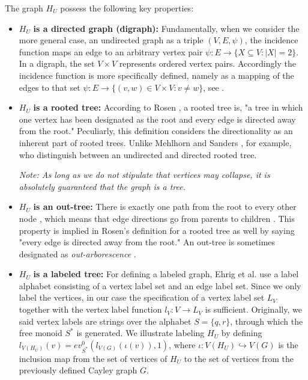 \begin{definition}
The graph $H_U$ possess the following key properties:
\begin{itemize}
	\item \mbox{\boldmath$H_U$} \textbf{is a directed graph (digraph):} Fundamentally, when we consider the more general case, an undirected graph as a triple $(V,E,\psi)$, the incidence function maps an edge to an arbitrary vertex pair $\psi : E\rightarrow\{X\subseteq V:\left|X\right|=2\}$. In a digraph, the set $V\times V$ represents ordered vertex pairs. Accordingly the incidence function is more specifically defined, namely as a mapping of the edges to that set $\psi : E\rightarrow\{(v,w)\in V\times V:v\neq w\}$, see \cite[p.~15]{Ref_Korte_Vygen}.
	\item \mbox{\boldmath$H_U$} \textbf{is a rooted tree:} According to Rosen \cite[p.~747]{Ref_Rosen}, a rooted tree is, "a tree in which one vertex has been designated as the root and every edge is directed away from the root." Peculiarly, this definition considers the directionality as an inherent part of rooted trees. Unlike Mehlhorn and Sanders \cite[p.~52]{Ref_Mehlhorn_Sanders}, for example, who distinguish between an undirected and directed rooted tree.
	\par\smallskip
	\textit{Note: As long as we do not stipulate that vertices may collapse, it is absolutely guaranteed that the graph is a tree.}
	\item \mbox{\boldmath$H_U$} \textbf{is an out-tree:} There is exactly one	path from the root to every other node \cite[p.~52]{Ref_Mehlhorn_Sanders}, which means that edge directions go from parents to children \cite[p.~108]{Ref_Du_Ko_Hu}. This property is implied in Rosen's definition for a rooted tree as well by saying "every edge is directed away from the root." An out-tree is sometimes designated as \textit{out-arborescence} \cite[p.~108]{Ref_Du_Ko_Hu}.
	\item \mbox{\boldmath$H_U$} \textbf{is a labeled tree:} For defining a labeled graph, Ehrig et al. \cite[p.~23]{Ref_Ehrig_etal} use a label alphabet consisting of a vertex label set and an edge label set. Since we only label the vertices, in our case the specification of a vertex label set $L_V$ together with the vertex label function $l_V:V\rightarrow L_V$ is sufficient. Originally, we said vertex labels are strings over the alphabet $S=\{q,r\}$, through which the free monoid $S^\ast$ is generated. We illustrate labeling $H_U$ by defining $l_{V(H_U)}(v)=ev^0_{S^\ast}(l_{V(G)}(\iota(v)),1)$, where $\iota:V(H_U)\hookrightarrow V(G)$ is the inclusion map \cite[p.~142]{Ref_Childs} from the set of vertices of $H_U$ to the set of vertices from the previously defined Cayley graph $G$.
\end{itemize}
\label{def:H_U}
\end{definition}

